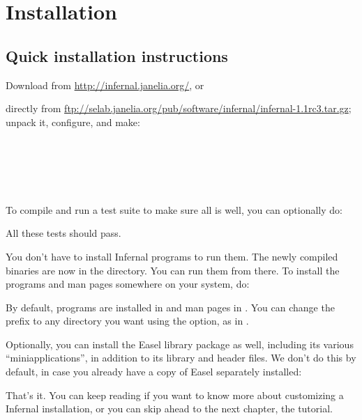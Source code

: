 \section{Installation}
\label{section:installation}
\setcounter{footnote}{0}

\subsection{Quick installation instructions}

Download  from \url{http://infernal.janelia.org/}, or

directly from
\url{ftp://selab.janelia.org/pub/software/infernal/infernal-1.1rc3.tar.gz};
unpack it, configure, and make:

\\
\\
\\
\\ 

To compile and run a test suite to make sure all is well, you can
optionally do:


All these tests should pass.

You don't have to install Infernal programs to run them. The newly
compiled binaries are now in the  directory. You can run
them from there. To install the programs and man pages somewhere on
your system, do:


By default, programs are installed in  and man
pages in . You can change the
 prefix to any directory you want using the
 option, as in .

Optionally, you can install the Easel library package as well,
including its various ``miniapplications'', in addition to its library
and header files. We don't do this by default, in case you already
have a copy of Easel separately installed:


That's it.  You can keep reading if you want to know more about
customizing a Infernal installation, or you can skip ahead to the next
chapter, the tutorial.

